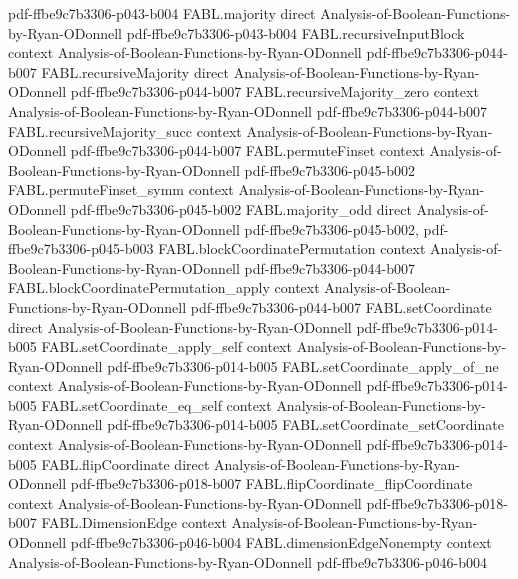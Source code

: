 \begin{theorem}
  {pdf-ffbe9c7b3306-p043-b004}
\proofstep
  {FABL.majority}
  {direct}
  {Analysis-of-Boolean-Functions-by-Ryan-ODonnell}
  {pdf-ffbe9c7b3306-p043-b004}
\proofstep
  {FABL.recursiveInputBlock}
  {context}
  {Analysis-of-Boolean-Functions-by-Ryan-ODonnell}
  {pdf-ffbe9c7b3306-p044-b007}
\proofstep
  {FABL.recursiveMajority}
  {direct}
  {Analysis-of-Boolean-Functions-by-Ryan-ODonnell}
  {pdf-ffbe9c7b3306-p044-b007}
\proofstep
  {FABL.recursiveMajority_zero}
  {context}
  {Analysis-of-Boolean-Functions-by-Ryan-ODonnell}
  {pdf-ffbe9c7b3306-p044-b007}
\proofstep
  {FABL.recursiveMajority_succ}
  {context}
  {Analysis-of-Boolean-Functions-by-Ryan-ODonnell}
  {pdf-ffbe9c7b3306-p044-b007}
\proofstep
  {FABL.permuteFinset}
  {context}
  {Analysis-of-Boolean-Functions-by-Ryan-ODonnell}
  {pdf-ffbe9c7b3306-p045-b002}
\proofstep
  {FABL.permuteFinset_symm}
  {context}
  {Analysis-of-Boolean-Functions-by-Ryan-ODonnell}
  {pdf-ffbe9c7b3306-p045-b002}
\proofstep
  {FABL.majority_odd}
  {direct}
  {Analysis-of-Boolean-Functions-by-Ryan-ODonnell}
  {pdf-ffbe9c7b3306-p045-b002,
    pdf-ffbe9c7b3306-p045-b003}
\proofstep
  {FABL.blockCoordinatePermutation}
  {context}
  {Analysis-of-Boolean-Functions-by-Ryan-ODonnell}
  {pdf-ffbe9c7b3306-p044-b007}
\proofstep
  {FABL.blockCoordinatePermutation_apply}
  {context}
  {Analysis-of-Boolean-Functions-by-Ryan-ODonnell}
  {pdf-ffbe9c7b3306-p044-b007}
\proofstep
  {FABL.setCoordinate}
  {direct}
  {Analysis-of-Boolean-Functions-by-Ryan-ODonnell}
  {pdf-ffbe9c7b3306-p014-b005}
\proofstep
  {FABL.setCoordinate_apply_self}
  {context}
  {Analysis-of-Boolean-Functions-by-Ryan-ODonnell}
  {pdf-ffbe9c7b3306-p014-b005}
\proofstep
  {FABL.setCoordinate_apply_of_ne}
  {context}
  {Analysis-of-Boolean-Functions-by-Ryan-ODonnell}
  {pdf-ffbe9c7b3306-p014-b005}
\proofstep
  {FABL.setCoordinate_eq_self}
  {context}
  {Analysis-of-Boolean-Functions-by-Ryan-ODonnell}
  {pdf-ffbe9c7b3306-p014-b005}
\proofstep
  {FABL.setCoordinate_setCoordinate}
  {context}
  {Analysis-of-Boolean-Functions-by-Ryan-ODonnell}
  {pdf-ffbe9c7b3306-p014-b005}
\proofstep
  {FABL.flipCoordinate}
  {direct}
  {Analysis-of-Boolean-Functions-by-Ryan-ODonnell}
  {pdf-ffbe9c7b3306-p018-b007}
\proofstep
  {FABL.flipCoordinate_flipCoordinate}
  {context}
  {Analysis-of-Boolean-Functions-by-Ryan-ODonnell}
  {pdf-ffbe9c7b3306-p018-b007}
\proofstep
  {FABL.DimensionEdge}
  {context}
  {Analysis-of-Boolean-Functions-by-Ryan-ODonnell}
  {pdf-ffbe9c7b3306-p046-b004}
\proofstep
  {FABL.dimensionEdgeNonempty}
  {context}
  {Analysis-of-Boolean-Functions-by-Ryan-ODonnell}
  {pdf-ffbe9c7b3306-p046-b004}

\end{theorem}
